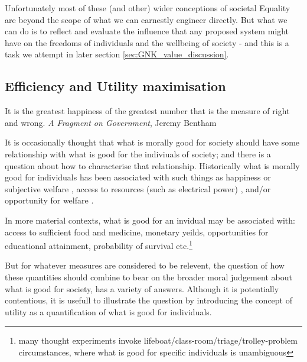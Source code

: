 Unfortunately most of these (and other) wider conceptions of societal Equality are beyond the scope of what we can earnestly engineer directly. But what we can do is to reflect and evaluate the influence that any proposed system might have on the freedoms of individuals and the wellbeing of society - and this is a task we attempt in later section \ref{sec:GNK_value_discussion}.

\subsection{Efficiency and Utility maximisation}\label{sec:philosophy_efficiency}


\begin{displayquote}It is the greatest happiness of the greatest number that is the measure of right and wrong. \textit{A Fragment on Government}, Jeremy Bentham\cite{bentham2001fragment}
\end{displayquote} 

It is occasionally thought that what is morally good for society should have some relationship with what is good for the indiviuals of society; and there is a question about how to characterise that relationship.
Historically what is morally good for individuals has been associated with such things as happiness \cite{burns2005happiness} or subjective welfare \cite{10.2307/2264894}, access to resources (such as electrical power) \cite{10.2307/2265047}, and/or opportunity for welfare \cite{10.2307/4320203}.%

In more material contexts, what is good for an invidual may be associated with: access to sufficient food and medicine, monetary yeilds, opportunities for educational attainment, probability of survival etc.\footnote{many thought experiments invoke lifeboat/class-room/triage/trolley-problem circumstances, where what is good for specific individuals is unambiguous}

But for whatever measures are considered to be relevent, the question of how these quantities should combine to bear on the broader moral judgement about what is good for society, has a variety of answers.
Although it is potentially contentious, it is usefull to illustrate the question by introducing the concept of utility as a quantification of what is good for individuals.

